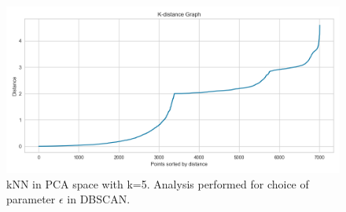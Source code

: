 \documentclass[a4paper,11pt]{article}
\begin{document}
\begin{figure}
\centering
\includegraphics[width=\linewidth]{figures/clustering/dbscan_k_distance.png}
\caption{kNN in PCA space with k=5. Analysis performed for choice of parameter $\epsilon$ in DBSCAN. }
\label{fig:kNN_PCA}
\end{figure}
\end{document}
